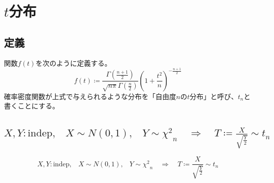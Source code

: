 \chapter{\texorpdfstring{$t$}{t}分布}
    \section{定義}
        \begin{shadebox}
            関数$f(t)$を次のように定義する。
            \[f(t) \coloneqq \frac{\Gamma{\left(\frac{n+1}{2}\right)}}{\sqrt{n\pi}\Gamma{\left(\frac{n}{2}\right)}}\left(1+\frac{t^2}{n}\right)^{-\frac{n+1}{2}}\]
            確率密度関数が上式で与えられるような分布を「自由度$n$の$t$分布」と呼び、$t_n$と書くことにする。
        \end{shadebox}
    \section{\thesubsection \texorpdfstring{$X,Y : \text{indep},\;\;\;X \sim N(0,1),\;\;\;Y \sim {\chi^2}_n \quad \Rightarrow \quad T \coloneqq \frac{X}{\sqrt{\frac{Y}{2}}} \sim t_n$}{X,Y: 独立, X～N(0,1), Y～χ\string^2\_n ⇒ T := X/√(Y/2) ～ t\_n}}
        \begin{shadebox}
            \[X,Y : \text{indep},\;\;\;X \sim N(0,1),\;\;\;Y \sim {\chi^2}_n \quad \Rightarrow \quad T \coloneqq \frac{X}{\sqrt{\frac{Y}{2}}} \sim t_n\]
        \end{shadebox}
